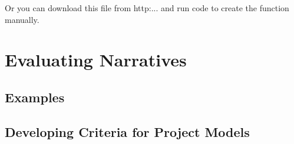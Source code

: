 \documentclass{article}\usepackage[]{graphicx}\usepackage[]{color}
\begin{document}
Or you can download this file from http:... and run code to create the function manually. 

\section{Evaluating Narratives}

\subsection{Examples}


\subsection{Developing Criteria for Project Models}

\subsection{}

\subsection{}
\end{document}
